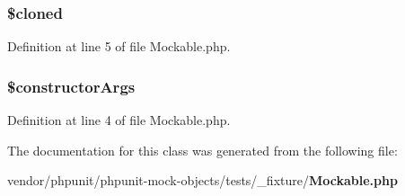 \subsubsection[{\$cloned}]{\setlength{\rightskip}{0pt plus 5cm}\$cloned}\label{class_mockable_adde823dfad7d62fbfb51f60b16dcb8d6}


Definition at line 5 of file Mockable.\+php.

\subsubsection[{\$constructor\+Args}]{\setlength{\rightskip}{0pt plus 5cm}\$constructor\+Args}\label{class_mockable_a08c864d90e2a98de43ac35cf7999ff7e}


Definition at line 4 of file Mockable.\+php.



The documentation for this class was generated from the following file\+:\begin{DoxyCompactItemize}
\item 
vendor/phpunit/phpunit-\/mock-\/objects/tests/\+\_\+fixture/{\bf Mockable.\+php}\end{DoxyCompactItemize}
